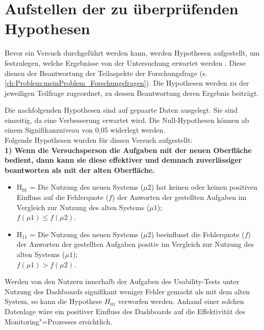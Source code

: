 \section{Aufstellen der zu überprüfenden Hypothesen} %
\label{ch:Ergebnisse:sec:Hypothesen}

Bevor ein Versuch durchgeführt werden kann, werden Hypothesen aufgestellt, um festzulegen, welche Ergebnisse von der Untersuchung erwartet werden \cite[S. 398]{Statistik:Sedlmeier:2018}. Diese dienen der Beantwortung der Teilaspekte der Forschungsfrage (s. \autoref{ch:Problem:meinProblem_Forschungsfragen}). Die Hypothesen werden zu der jeweiligen Teilfrage zugeordnet, zu dessen Beantwortung deren Ergebnis beiträgt.

Die nachfolgenden Hypothesen sind auf gepaarte Daten ausgelegt. Sie sind einseitig, da eine Verbesserung erwartet wird. Die Null-Hypothesen können ab einem Signifikanzniveau von 0,05 widerlegt werden.\\
Folgende Hypothesen wurden für diesen Versuch aufgestellt:\\



\noindent
\textbf{1) Wenn die Versuchsperson die Aufgaben mit der neuen Oberfläche bedient, dann kann sie diese effektiver und demnach zuverlässiger beantworten als mit der alten Oberfläche.}

\begin{itemize}
    \item H$_{01}$ = Die Nutzung des neuen Systems ($\mu2$) hat keinen oder keinen positiven Einfluss auf die Fehlerquote ($f$) der Anworten der gestellten Aufgaben im Vergleich zur Nutzung des alten Systems ($\mu1$); \\
    $f(\mu1) \leq f(\mu2)$.
    \item H$_{11}$ = Die Nutzung des neuen Systems ($\mu2$) beeinflusst die Fehlerquote ($f$) der Anworten der gestellten Aufgaben positiv im Vergleich zur Nutzung des alten Systems ($\mu1$); \\
    $f(\mu1) > f(\mu2)$.
\end{itemize}

\noindent
Werden von den Nutzern innerhalb der Aufgaben des Usability-Tests unter Nutzung des Dash\-boards signifikant weniger Fehler gemacht als mit dem alten System, so kann die Hypothese $H_{01}$ verworfen werden. Anhand einer solchen Datenlage wäre ein positiver Einfluss des Dash\-boards auf die Effektivität des Monitoring"=Prozesses ersichtlich.

